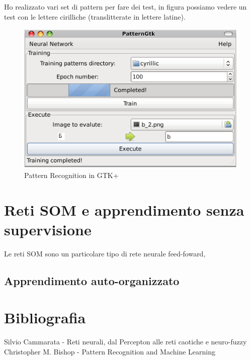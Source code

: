 \documentclass[a4paper,10pt]{book}
\begin{document}
Ho realizzato vari set di pattern per fare dei test, in figura possiamo
vedere un test con le lettere cirilliche (translitterate in lettere latine).
\begin{figure}[h]
	\begin{center}	
		\includegraphics{img/screen/patrec1.png}
		\caption{Pattern Recognition in GTK+}
		\label{fig: Programma di Pattern Recognition in GTK+}
	\end{center}
\end{figure}




\chapter{Reti SOM e apprendimento senza supervisione}
Le reti SOM sono un particolare tipo di rete neurale feed-foward, 

\section{Apprendimento auto-organizzato}



\chapter{Bibliografia}
\begin{thebibliography}{Bibliografia}
	 Silvio Cammarata - Reti neurali, dal Percepton alle reti caotiche e neuro-fuzzy
	 Christopher M. Bishop - Pattern Recognition and Machine Learning
\end{thebibliography}

\appendix
\end{document}
